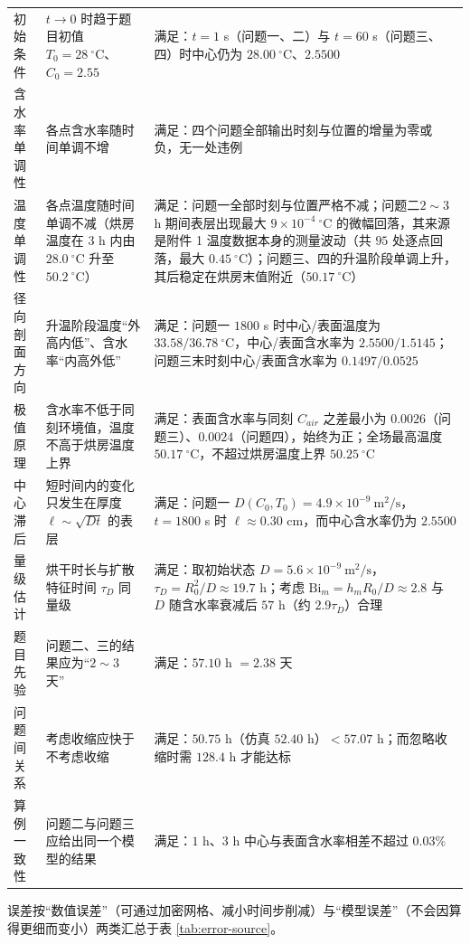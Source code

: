 \documentclass[12pt,a4paper]{article}
\begin{document}
\begin{center}
{\begin{longtable}{p{2.6cm}p{5.4cm}p{6.6cm}}
\bottomrule
\endlastfoot

初始条件 & $t\to0$ 时趋于题目初值 $T_0=28\ \mathrm{^\circ C}$、$C_0=2.55$ & 满足：$t=1$ s（问题一、二）与 $t=60$ s（问题三、四）时中心仍为 $28.00\ \mathrm{^\circ C}$、$2.5500$\\
含水率单调性 & 各点含水率随时间单调不增 & 满足：四个问题全部输出时刻与位置的增量为零或负，无一处违例\\
温度单调性 & 各点温度随时间单调不减（烘房温度在 $3$ h 内由 $28.0\ \mathrm{^\circ C}$ 升至 $50.2\ \mathrm{^\circ C}$） & 满足：问题一全部时刻与位置严格不减；问题二$2\sim3$ h 期间表层出现最大 $9\times10^{-4}\ \mathrm{^\circ C}$ 的微幅回落，其来源是附件 1 温度数据本身的测量波动（共 $95$ 处逐点回落，最大 $0.45\ \mathrm{^\circ C}$）；问题三、四的升温阶段单调上升，其后稳定在烘房末值附近（$50.17\ \mathrm{^\circ C}$）\\
径向剖面方向 & 升温阶段温度“外高内低”、含水率“内高外低” & 满足：问题一 $1800$ s 时中心/表面温度为 $33.58/36.78\ \mathrm{^\circ C}$，中心/表面含水率为 $2.5500/1.5145$；问题三末时刻中心/表面含水率为 $0.1497/0.0525$\\
极值原理 & 含水率不低于同刻环境值，温度不高于烘房温度上界 & 满足：表面含水率与同刻 $C_{air}$ 之差最小为 $0.0026$（问题三）、$0.0024$（问题四），始终为正；全场最高温度 $50.17\ \mathrm{^\circ C}$，不超过烘房温度上界 $50.25\ \mathrm{^\circ C}$\\
中心滞后 & 短时间内的变化只发生在厚度 $\ell\sim\sqrt{Dt}$ 的表层 & 满足：问题一 $D(C_0,T_0)=4.9\times10^{-9}\ \mathrm{m^2/s}$，$t=1800$ s 时 $\ell\approx0.30$ cm，而中心含水率仍为 $2.5500$\\
量级估计 & 烘干时长与扩散特征时间 $\tau_D$ 同量级 & 满足：取初始状态 $D=5.6\times10^{-9}\ \mathrm{m^2/s}$，$\tau_D=R_0^{2}/D\approx19.7$ h；考虑 $\mathrm{Bi}_m=h_mR_0/D\approx2.8$ 与 $D$ 随含水率衰减后 $57$ h（约 $2.9\tau_D$）合理\\
题目先验 & 问题二、三的结果应为“$2\sim3$ 天” & 满足：$57.10$ h $=2.38$ 天\\
问题间关系 & 考虑收缩应快于不考虑收缩 & 满足：$50.75$ h（仿真 $52.40$ h）$<57.07$ h；而忽略收缩时需 $128.4$ h 才能达标\\
算例一致性 & 问题二与问题三应给出同一个模型的结果 & 满足：$1$ h、$3$ h 中心与表面含水率相差不超过 $0.03\%$\\
\end{longtable}
}

误差按“数值误差”（可通过加密网格、减小时间步削减）与“模型误差”（不会因算得更细而变小）两类汇总于表 \ref{tab:error-source}。


\end{center}
\end{document}
